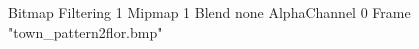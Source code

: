 {Bitmap
	{Filtering 1}
	{Mipmap 1}
	{Blend none}
	{AlphaChannel 0}
	{Frame "town_pattern2flor.bmp"}
}
